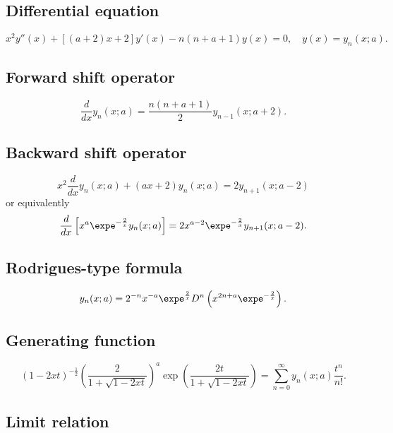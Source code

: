 \documentclass[envcountchap,graybox]{svmono}
\begin{document}
\subsection*{Differential equation}
\begin{equation}
\label{dvBessel}
x^2y''(x)+\left[(a+2)x+2\right]y'(x)-n(n+a+1)y(x)=0,\quad y(x)=y_n(x;a).
\end{equation}

\subsection*{Forward shift operator}
\begin{equation}
\label{shift1Bessel}
\frac{d}{dx}y_n(x;a)=\frac{n(n+a+1)}{2}y_{n-1}(x;a+2).
\end{equation}

\subsection*{Backward shift operator}
\begin{equation}
\label{shift2BesselI}
x^2\frac{d}{dx}y_n(x;a)+(ax+2)y_n(x;a)=2y_{n+1}(x;a-2)
\end{equation}
or equivalently
\begin{equation}
\label{shift2BesselII}
\frac{d}{dx}\left[x^a\expe^{-\frac{2}{x}}y_n(x;a)\right]=2x^{a-2}\expe^{-\frac{2}{x}}y_{n+1}(x;a-2).
\end{equation}

\subsection*{Rodrigues-type formula}
\begin{equation}
\label{RodBessel}
y_n(x;a)=2^{-n}x^{-a}\expe^{\frac{2}{x}}D^n\left(x^{2n+a}\expe^{-\frac{2}{x}}\right).
\end{equation}

\subsection*{Generating function}
\begin{equation}
\label{GenBessel}
\left(1-2xt\right)^{-\frac{1}{2}}\left(\frac{2}{1+\sqrt{1-2xt}}\right)^a
\exp\left(\frac{2t}{1+\sqrt{1-2xt}}\right)=\sum_{n=0}^{\infty}y_n(x;a)\frac{t^n}{n!}.
\end{equation}

\subsection*{Limit relation}
\end{document}
